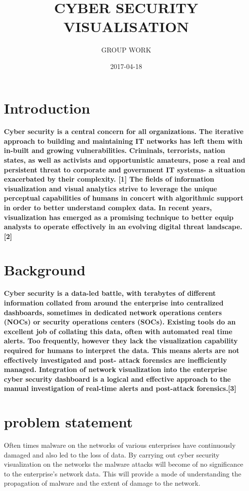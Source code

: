 \documentclass[12pt]{report}
\title{CYBER SECURITY VISUALISATION}
\author{GROUP WORK}
\date{2017-04-18}
\begin{document}
\maketitle

\section{Introduction}
\paragraph{Cyber security is a central concern for all organizations. The iterative approach to building and maintaining IT networks has left them with in-built and growing vulnerabilities. Criminals, terrorists, nation states, as well as activists and opportunistic amateurs, pose a real and persistent threat to corporate and government IT systems- a situation exacerbated by their complexity. [1] 
The fields of information visualization and visual analytics strive to leverage the unique perceptual capabilities of humans in concert with algorithmic support in order to better understand complex data. In recent years, visualization has emerged as a promising technique to better equip analysts to operate effectively in an evolving digital threat landscape. [2]
}

\section{Background}
\paragraph{Cyber security is a data-led battle, with terabytes of different information collated from around the enterprise into centralized dashboards, sometimes in dedicated network operations centers (NOCs) or security operations centers (SOCs). Existing tools do an excellent job of collating this data, often with automated real time alerts. Too frequently, however they lack the visualization capability required for humans to interpret the data. This means alerts are not effectively investigated and post- attack forensics are inefficiently managed. Integration of network visualization into the enterprise cyber security dashboard is a logical and effective approach to the manual investigation of real-time alerts and post-attack forensics.[3] }

\section{problem statement}
Often times malware on the networks of various enterprises have continuously damaged and also led to the loss of data. By carrying out cyber security visualization on the networks the malware attacks will become of no significance to the enterprise’s network data. This will provide a mode of understanding the propagation of malware and the extent of damage to the network.
\end{document}
